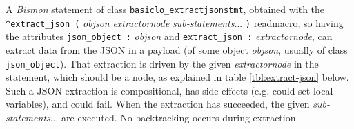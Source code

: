 A \emph{Bismon} statement of class \texttt{basiclo\_extractjsonstmt},
obtained with the \texttt{{\^{}}{extract\_json} (} \textit{objson}
\textit {extractornode} \textit{sub-statements}... \texttt{)}
readmacro, so having the attributes \texttt{json\_object :}
\textit{objson} and \texttt{extract\_json :} \textit{extractornode},
 
 can extract data from the JSON in a
payload (of some object \textit{objson}, usually of class
\texttt{json\_object}). That extraction is driven by the given
\textit{extractornode} in the statement, which should be a node, as
explained in table \ref{tbl:extract-json} below.  Such a JSON
extraction is compositional, has side-effects (e.g. could set local
variables), and could fail. When the extraction has succeeded, the
given \textit{sub-statements}... are executed. No backtracking occurs
during extraction.

